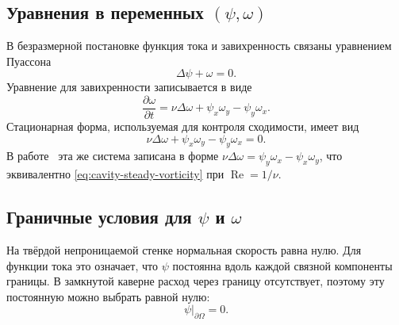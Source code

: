 \documentclass[12pt,a4paper]{article}
\newcommand{\Reynolds}{\operatorname{Re}}
\newcommand{\Laplace}{\Delta}
\begin{document}
\subsection{Уравнения в переменных \texorpdfstring{\((\psi,\omega)\)}{psi, omega}}

В безразмерной постановке функция тока и завихренность связаны уравнением Пуассона
\begin{equation}
    \Laplace\psi+\omega=0.
    \label{eq:poisson-cavity}
\end{equation}
Уравнение для завихренности записывается в виде
\begin{equation}
    \frac{\partial\omega}{\partial t}
    =
    \nu\Laplace\omega
    +
    \psi_x\omega_y-\psi_y\omega_x.
    \label{eq:cavity-vorticity-evolution}
\end{equation}
Стационарная форма, используемая для контроля сходимости, имеет вид
\begin{equation}
    \nu\Laplace\omega+\psi_x\omega_y-\psi_y\omega_x=0.
    \label{eq:cavity-steady-vorticity}
\end{equation}
В работе~\cite{erturk2005} эта же система записана в форме \(\nu\Laplace\omega=\psi_y\omega_x-\psi_x\omega_y\), что эквивалентно \eqref{eq:cavity-steady-vorticity} при \(\Reynolds=1/\nu\).

\subsection{Граничные условия для \texorpdfstring{\(\psi\)}{psi} и \texorpdfstring{\(\omega\)}{omega}}

На твёрдой непроницаемой стенке нормальная скорость равна нулю.
Для функции тока это означает, что \(\psi\) постоянна вдоль каждой связной компоненты границы.
В замкнутой каверне расход через границу отсутствует, поэтому эту постоянную можно выбрать равной нулю:
\begin{equation}
    \psi\big|_{\partial\Omega}=0.
    \label{eq:cavity-psi-bc}
\end{equation}
\end{document}
